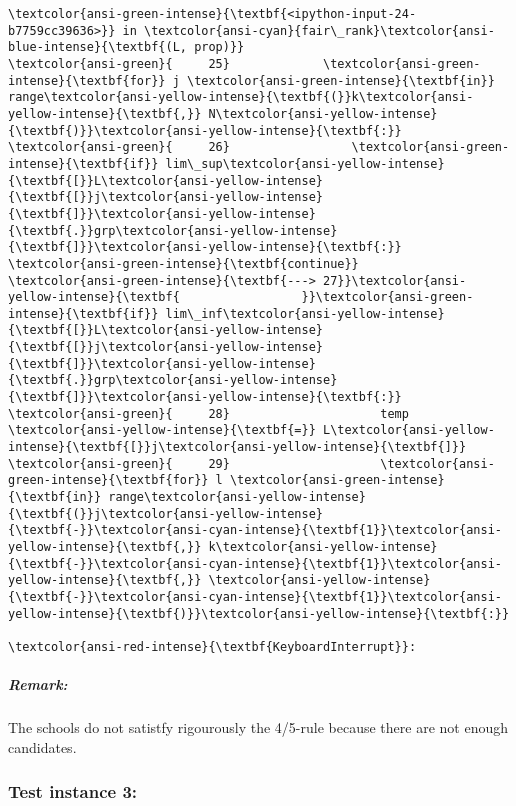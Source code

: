 \documentclass[11pt]{article}
\begin{document}
\begin{Verbatim}[commandchars=\\\{\}, frame=single, framerule=2mm, rulecolor=\color{outerrorbackground}]
\textcolor{ansi-green-intense}{\textbf{<ipython-input-24-b7759cc39636>}} in \textcolor{ansi-cyan}{fair\_rank}\textcolor{ansi-blue-intense}{\textbf{(L, prop)}}
\textcolor{ansi-green}{     25}             \textcolor{ansi-green-intense}{\textbf{for}} j \textcolor{ansi-green-intense}{\textbf{in}} range\textcolor{ansi-yellow-intense}{\textbf{(}}k\textcolor{ansi-yellow-intense}{\textbf{,}} N\textcolor{ansi-yellow-intense}{\textbf{)}}\textcolor{ansi-yellow-intense}{\textbf{:}}
\textcolor{ansi-green}{     26}                 \textcolor{ansi-green-intense}{\textbf{if}} lim\_sup\textcolor{ansi-yellow-intense}{\textbf{[}}L\textcolor{ansi-yellow-intense}{\textbf{[}}j\textcolor{ansi-yellow-intense}{\textbf{]}}\textcolor{ansi-yellow-intense}{\textbf{.}}grp\textcolor{ansi-yellow-intense}{\textbf{]}}\textcolor{ansi-yellow-intense}{\textbf{:}} \textcolor{ansi-green-intense}{\textbf{continue}}
\textcolor{ansi-green-intense}{\textbf{---> 27}}\textcolor{ansi-yellow-intense}{\textbf{                 }}\textcolor{ansi-green-intense}{\textbf{if}} lim\_inf\textcolor{ansi-yellow-intense}{\textbf{[}}L\textcolor{ansi-yellow-intense}{\textbf{[}}j\textcolor{ansi-yellow-intense}{\textbf{]}}\textcolor{ansi-yellow-intense}{\textbf{.}}grp\textcolor{ansi-yellow-intense}{\textbf{]}}\textcolor{ansi-yellow-intense}{\textbf{:}}
\textcolor{ansi-green}{     28}                     temp \textcolor{ansi-yellow-intense}{\textbf{=}} L\textcolor{ansi-yellow-intense}{\textbf{[}}j\textcolor{ansi-yellow-intense}{\textbf{]}}
\textcolor{ansi-green}{     29}                     \textcolor{ansi-green-intense}{\textbf{for}} l \textcolor{ansi-green-intense}{\textbf{in}} range\textcolor{ansi-yellow-intense}{\textbf{(}}j\textcolor{ansi-yellow-intense}{\textbf{-}}\textcolor{ansi-cyan-intense}{\textbf{1}}\textcolor{ansi-yellow-intense}{\textbf{,}} k\textcolor{ansi-yellow-intense}{\textbf{-}}\textcolor{ansi-cyan-intense}{\textbf{1}}\textcolor{ansi-yellow-intense}{\textbf{,}} \textcolor{ansi-yellow-intense}{\textbf{-}}\textcolor{ansi-cyan-intense}{\textbf{1}}\textcolor{ansi-yellow-intense}{\textbf{)}}\textcolor{ansi-yellow-intense}{\textbf{:}}

\textcolor{ansi-red-intense}{\textbf{KeyboardInterrupt}}: 
    \end{Verbatim}

    \hypertarget{remark}{%
\subparagraph{Remark:}\label{remark}}

The schools do not satistfy rigourously the 4/5-rule because there are
not enough candidates.

    \hypertarget{test-instance-3}{%
\subsubsection{Test instance 3:}\label{test-instance-3}}
\end{document}
